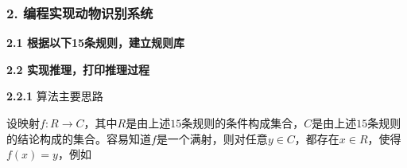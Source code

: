 \documentclass[a4paper]{article}   %
\begin{document}
 	\subsubsection*{2. \quad 编程实现动物识别系统}
 	\noindent
 	\textbf{2.1 根据以下15条规则，建立规则库} \par 
 	\begin{figure}[!htbp]
 		\centering
 	\end{figure}
 	\noindent
 	\textbf{2.2 实现推理，打印推理过程} \par
 	\noindent
 	\textbf{2.2.1} 算法主要思路 \par 
 	设映射$ f: R \rightarrow C $，其中$ R $是由上述$ 15 $条规则的条件构成集合，$ C $是由上述$ 15 $条规则的结论构成的集合。容易知道$ f $是一个满射，则对任意$ y \in C $，都存在$ x \in R $，使得$ f(x) = y $，例如
\end{document}
